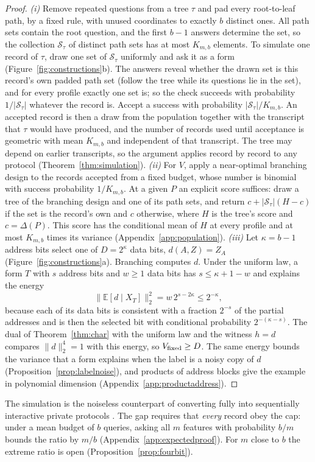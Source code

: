\documentclass{article}
\newcommand{\E}{\mathbb{E}}
\begin{document}
\begin{proof}
\emph{(i)} Remove repeated questions from a tree $\tau$ and pad every root-to-leaf path, by a fixed rule, with unused coordinates to exactly $b$ distinct ones. All path sets contain the root question, and the first $b-1$ answers determine the set, so the collection $\mathcal S_\tau$ of distinct path sets has at most $K_{m,b}$ elements. To simulate one record of $\tau$, draw one set of $\mathcal S_\tau$ uniformly and ask it as a form (Figure~\ref{fig:constructions}b). The answers reveal whether the drawn set is this record's own padded path set (follow the tree while its questions lie in the set), and for every profile exactly one set is; so the check succeeds with probability $1/|\mathcal S_\tau|$ whatever the record is. Accept a success with probability $|\mathcal S_\tau|/K_{m,b}$. An accepted record is then a draw from the population together with the transcript that $\tau$ would have produced, and the number of records used until acceptance is geometric with mean $K_{m,b}$ and independent of that transcript. The tree may depend on earlier transcripts, so the argument applies record by record to any protocol (Theorem~\ref{thm:simulation}). \emph{(ii)} For $V$, apply a near-optimal branching design to the records accepted from a fixed budget, whose number is binomial with success probability $1/K_{m,b}$. At a given $P$ an explicit score suffices: draw a tree of the branching design and one of its path sets, and return $c+|\mathcal S_\tau|(H-c)$ if the set is the record's own and $c$ otherwise, where $H$ is the tree's score and $c=\Delta(P)$. This score has the conditional mean of $H$ at every profile and at most $K_{m,b}$ times its variance (Appendix~\ref{app:population}). \emph{(iii)} Let $\kappa=b-1$ address bits select one of $D=2^\kappa$ data bits, $d(A,Z)=Z_A$ (Figure~\ref{fig:constructions}a). Branching computes $d$. Under the uniform law, a form $T$ with $s$ address bits and $w\ge1$ data bits has $s\le\kappa+1-w$ and explains the energy
\begin{equation}
 \|\E[d\mid X_T]\|_2^2=w\,2^{s-2\kappa}\le2^{-\kappa},\label{eq:addressinformation}
\end{equation}
because each of its data bits is consistent with a fraction $2^{-s}$ of the partial addresses and is then the selected bit with conditional probability $2^{-(\kappa-s)}$. The dual of Theorem~\ref{thm:char} with the uniform law and the witness $h=d$ compares $\|d\|_2^4=1$ with this energy, so $V_{\rm fixed}\ge D$. The same energy bounds the variance that a form explains when the label is a noisy copy of $d$ (Proposition~\ref{prop:labelnoise}), and products of address blocks give the example in polynomial dimension (Appendix~\ref{app:productaddress}).
\end{proof}
The simulation is the noiseless counterpart of converting fully into sequentially interactive private protocols \citep{joseph2019}. The gap requires that \emph{every} record obey the cap: under a mean budget of $b$ queries, asking all $m$ features with probability $b/m$ bounds the ratio by $m/b$ (Appendix~\ref{app:expectedproof}). For $m$ close to $b$ the extreme ratio is open (Proposition~\ref{prop:fourbit}).
\end{document}
